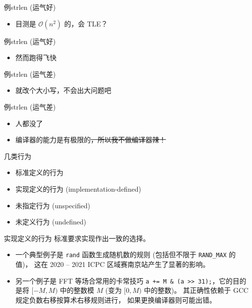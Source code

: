 \documentclass[10pt,mathserif]{beamer}
\newcommand{\lstcode}[1] {  }
\newcommand{\lstterm}[1] {  }
\begin{document}
\begin{frame}[fragile]{例}{strlen (运气好)}
	\lstcode{strlen-1.cc}
	\begin{itemize}
		\item 目测是 $\mathcal{O}(n^2)$ 的，会 TLE？
	\end{itemize}
\end{frame}

\begin{frame}[fragile]{例}{strlen (运气好)}
	\lstterm{strlen-1.out}
	\begin{itemize}
		\item 然而跑得飞快
	\end{itemize}
\end{frame}

\begin{frame}[fragile]{例}{strlen (运气差)}
	\lstcode{strlen-2.cc}
	\begin{itemize}
		\item 就改个大小写，不会出大问题吧
	\end{itemize}
\end{frame}

\begin{frame}[fragile]{例}{strlen (运气差)}
	\lstterm{strlen-2.out}
	\begin{itemize}
		\item 人都没了
		\item 编译器的能力是有极限的\sout{，所以我不做编译器辣！}
	\end{itemize}
\end{frame}

\begin{frame}{几类行为}
	\begin{itemize}
		\item 标准定义的行为
		\item 实现定义的行为 (implementation-defined)
		\item 未指定行为 (unspecified)
		\item 未定义行为 (undefined)
	\end{itemize}
\end{frame}

\begin{frame}[fragile]{实现定义的行为}
	标准要求实现作出一致的选择。
	\begin{itemize}
		\item 一个典型例子是 \lstinline{rand} 函数生成随机数的规则
			(包括但不限于 \lstinline{RAND_MAX} 的值)，
			这在 2020 -- 2021 ICPC 区域赛南京站产生了显著的影响。
		\item 另一个例子是 FFT 等场合常用的卡常技巧
			\lstinline{a += M & (a >> 31);}，它的目的是将
			$[-M, M)$ 中的整数模 $M$ (变为 $[0, M)$ 中的整数)。
			其正确性依赖于 GCC 规定负数右移按算术右移规则进行，
			如果更换编译器则可能出错。
	\end{itemize}
\end{frame}
\end{document}
